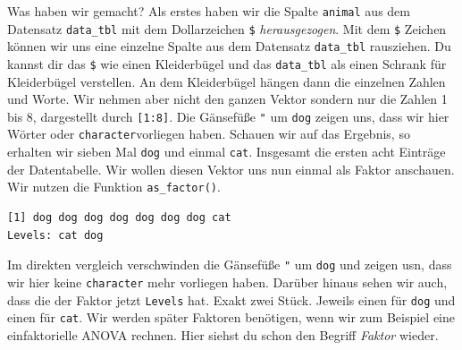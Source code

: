 \documentclass[
  letterpaper,
]{scrbook}
\newenvironment{Shaded}{\begin{snugshade}}{\end{snugshade}}
\newcommand{\DecValTok}[1]{\textcolor[rgb]{0.68,0.00,0.00}{#1}}
\newcommand{\FunctionTok}[1]{\textcolor[rgb]{0.28,0.35,0.67}{#1}}
\newcommand{\NormalTok}[1]{\textcolor[rgb]{0.00,0.23,0.31}{#1}}
\newcommand{\SpecialCharTok}[1]{\textcolor[rgb]{0.37,0.37,0.37}{#1}}
\begin{document}
Was haben wir gemacht? Als erstes haben wir die Spalte \texttt{animal}
aus dem Datensatz \texttt{data\_tbl} mit dem Dollarzeichen \texttt{\$}
\emph{herausgezogen}. Mit dem \texttt{\$} Zeichen können wir uns eine
einzelne Spalte aus dem Datensatz \texttt{data\_tbl} rausziehen. Du
kannst dir das \texttt{\$} wie einen Kleiderbügel und das
\texttt{data\_tbl} als einen Schrank für Kleiderbügel verstellen. An dem
Kleiderbügel hängen dann die einzelnen Zahlen und Worte. Wir nehmen aber
nicht den ganzen Vektor sondern nur die Zahlen 1 bis 8, dargestellt
durch \texttt{{[}1:8{]}}. Die Gänsefüße \texttt{"} um \texttt{dog}
zeigen uns, dass wir hier Wörter oder \texttt{character}vorliegen haben.
Schauen wir auf das Ergebnis, so erhalten wir sieben Mal \texttt{dog}
und einmal \texttt{cat}. Insgesamt die ersten acht Einträge der
Datentabelle. Wir wollen diesen Vektor uns nun einmal als Faktor
anschauen. Wir nutzen die Funktion \texttt{as\_factor()}.
{}

\begin{Shaded}
\end{Shaded}

\begin{verbatim}
[1] dog dog dog dog dog dog dog cat
Levels: cat dog
\end{verbatim}

Im direkten vergleich verschwinden die Gänsefüße \texttt{"} um
\texttt{dog} und zeigen usn, dass wir hier keine \texttt{character} mehr
vorliegen haben. Darüber hinaus sehen wir auch, dass die der Faktor
jetzt \texttt{Levels} hat. Exakt zwei Stück. Jeweils einen für
\texttt{dog} und einen für \texttt{cat}. Wir werden später Faktoren
benötigen, wenn wir zum Beispiel eine einfaktorielle ANOVA rechnen. Hier
siehst du schon den Begriff \emph{Faktor} wieder.

\end{document}
